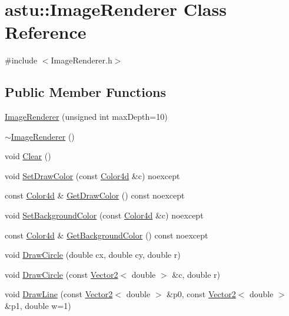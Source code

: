 \hypertarget{classastu_1_1ImageRenderer}{}\section{astu\+:\+:Image\+Renderer Class Reference}
\label{classastu_1_1ImageRenderer}


{\ttfamily \#include $<$Image\+Renderer.\+h$>$}

\subsection*{Public Member Functions}
\begin{DoxyCompactItemize}
\item 
\hyperlink{classastu_1_1ImageRenderer_ac22ff902eee74bd90e4371609d75aa6a}{Image\+Renderer} (unsigned int max\+Depth=10)
\item 
\hyperlink{classastu_1_1ImageRenderer_ac35d79e814253e2a2755da114e05d05c}{$\sim$\+Image\+Renderer} ()
\item 
void \hyperlink{classastu_1_1ImageRenderer_ae81b23f9e19254a7923cadf2a9e081a3}{Clear} ()
\item 
void \hyperlink{classastu_1_1ImageRenderer_ae2de9a19765358aaf0ce3b0086afe593}{Set\+Draw\+Color} (const \hyperlink{classastu_1_1Color}{Color4d} \&c) noexcept
\item 
const \hyperlink{classastu_1_1Color}{Color4d} \& \hyperlink{classastu_1_1ImageRenderer_a7e484c1340fad5f39ee9b61338a0d0d0}{Get\+Draw\+Color} () const noexcept
\item 
void \hyperlink{classastu_1_1ImageRenderer_a01d5e67526360be932393a0ec477147c}{Set\+Background\+Color} (const \hyperlink{classastu_1_1Color}{Color4d} \&c) noexcept
\item 
const \hyperlink{classastu_1_1Color}{Color4d} \& \hyperlink{classastu_1_1ImageRenderer_a5eecdafb01ab9261d07f623d81dd24c4}{Get\+Background\+Color} () const noexcept
\item 
void \hyperlink{classastu_1_1ImageRenderer_a903b1b78edee5f09b9ee1f604d762c28}{Draw\+Circle} (double cx, double cy, double r)
\item 
void \hyperlink{classastu_1_1ImageRenderer_a914047284fae6e8f58614018c8575f4e}{Draw\+Circle} (const \hyperlink{classastu_1_1Vector2}{Vector2}$<$ double $>$ \&c, double r)
\item 
void \hyperlink{classastu_1_1ImageRenderer_a968b3ac1ef2611e149494d0855fbab85}{Draw\+Line} (const \hyperlink{classastu_1_1Vector2}{Vector2}$<$ double $>$ \&p0, const \hyperlink{classastu_1_1Vector2}{Vector2}$<$ double $>$ \&p1, double w=1)

\end{DoxyCompactItemize}
